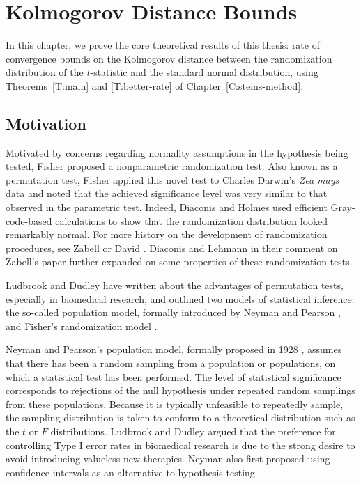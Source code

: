 \chapter{Kolmogorov Distance Bounds}
\label{C:stein-proof} In this chapter, we prove the core theoretical
results of this thesis: rate of convergence bounds on the Kolmogorov
distance between the randomization distribution of the $t$-statistic
and the standard normal distribution, using
Theorems~\ref{T:main} and \ref{T:better-rate} of Chapter~\ref{C:steins-method}.

\section{Motivation}
Motivated by concerns regarding normality
assumptions in the hypothesis being tested, Fisher
\cite{fisher1935design} proposed a nonparametric randomization test.
Also known as a permutation test, Fisher applied this novel test to
Charles Darwin's \emph{Zea mays} data and noted that the achieved
significance level was very similar to that observed in the parametric
test.  Indeed, Diaconis and Holmes \cite{diaconis1994gray} used
efficient Gray-code-based calculations to show that the randomization
distribution looked remarkably normal.  For more history on the
development of randomization procedures, see Zabell
\cite{zabell2008student} or David \cite{david2008beginnings}.
Diaconis and Lehmann \cite{diaconis2008comment} in their comment on
Zabell's paper further expanded on some properties of these
randomization tests.

Ludbrook and Dudley \cite{ludbrook1998permutation} have written about
the advantages of permutation tests, especially in biomedical
research, and outlined two models of statistical inference: the
so-called population model, formally introduced by Neyman and Pearson
\cite{neyman1928use}, and Fisher's randomization model
\cite{fisher1935design}.

Neyman and Pearson's population model, formally proposed in 1928
\cite{neyman1928use}, assumes that there has been a random sampling
from a population or populations, on which a statistical test has been
performed.  The level of statistical significance corresponds to
rejections of the null hypothesis under repeated random samplings from
these populations.  Because it is typically unfeasible to repeatedly
sample, the sampling distribution is taken to conform to a theoretical
distribution such as the $t$ or $F$ distributions.  Ludbrook and
Dudley argued that the preference for controlling Type I error rates
in biomedical research is due to the strong desire to avoid introducing
valueless new therapies.  Neyman \cite{neyman1934two} also first proposed
using confidence intervals as an alternative to hypothesis testing.


